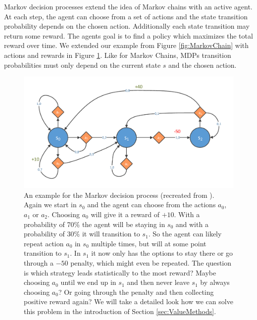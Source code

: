 Markov decision processes extend the idea of Markov chains with an active agent. At each step, the agent can choose from a set of actions and the state transition probability depends on the chosen action. Additionally each state transition may return some reward. The agents goal is to find a policy which maximizes the total reward over time. We extended our example from Figure \ref{fig:MarkovChain} with actions and rewards in Figure \ref{fig:MDP}. Like for Markov Chains, MDPs transition probabilities must only depend on the current state $s$ and the chosen action.\\

\begin{figure}[ht]
  
  \begin{center}
      \includegraphics[trim=10px 10px 10px 10px, clip, width=0.9\columnwidth]{figures/rl/markov_decision_process.pdf}
  \end{center}
  
  \caption[An Example for the Markov Decision Process Example]{An example for the Markov decision process (recreated from \cite{handson2019geron}). Again we start in $s_0$ and the agent can choose from the actions $a_0$, $a_1$ or $a_2$. Choosing $a_0$ will give it a reward of $+10$. With a probability of 70\% the agent will be staying in $s_0$ and with a probability of 30\% it will transition to $s_1$. So the agent can likely repeat action $a_0$ in $s_0$ multiple times, but will at some point transition to $s_1$. In $s_1$ it now only has the options to stay there or go through a $-50$ penalty, which might even be repeated. The question is which strategy leads statistically to the most reward? Maybe choosing $a_0$ until we end up in $s_1$ and then never leave $s_1$ by always choosing $a_0$? Or going through the penalty and then collecting positive reward again? We will take a detailed look how we can solve this problem in the introduction of Section \ref{sec:ValueMethods}.}
  \label{fig:MDP}
\end{figure}

